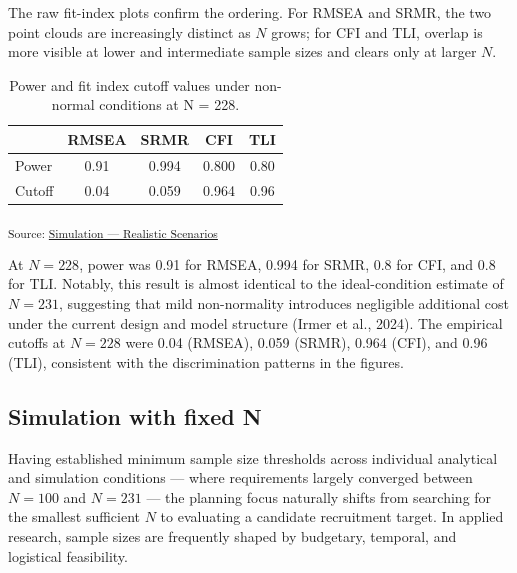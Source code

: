 \documentclass[
  letterpaper,
  DIV=11,
  numbers=noendperiod]{scrartcl}
\begin{document}
The raw fit-index plots confirm the ordering. For RMSEA and SRMR, the
two point clouds are increasingly distinct as \(N\) grows; for CFI and
TLI, overlap is more visible at lower and intermediate sample sizes and
clears only at larger \(N\).

{

\begin{longtable}[]{@{}lcccc@{}}

\caption{\label{tbl-power-cutoff-nnorm}Power and fit index cutoff values
under non-normal conditions at N = 228.}

\tabularnewline

\toprule\noalign{}
& RMSEA & SRMR & CFI & TLI \\
\midrule\noalign{}
\endhead
\bottomrule\noalign{}
\endlastfoot
Power & 0.91 & 0.994 & 0.800 & 0.80 \\
Cutoff & 0.04 & 0.059 & 0.964 & 0.96 \\

\end{longtable}

}

\textsubscript{Source:
\href{https://phdpablo.github.io/cfa-power/Scripts/AnalysisScripts/04_simulation_robust-preview.html\#cell-tbl-power-cutoff-nnorm}{Simulation
--- Realistic Scenarios}}

At \(N = 228\), power was 0.91 for RMSEA, 0.994 for SRMR, 0.8 for CFI,
and 0.8 for TLI. Notably, this result is almost identical to the
ideal-condition estimate of \(N = 231\), suggesting that mild
non-normality introduces negligible additional cost under the current
design and model structure (Irmer et al., 2024). The empirical cutoffs
at \(N = 228\) were 0.04 (RMSEA), 0.059 (SRMR), 0.964 (CFI), and 0.96
(TLI), consistent with the discrimination patterns in the figures.

\subsection{Simulation with fixed N}\label{sec-scenarios-fixed}

Having established minimum sample size thresholds across individual
analytical and simulation conditions --- where requirements largely
converged between \(N = 100\) and \(N = 231\) --- the planning focus
naturally shifts from searching for the smallest sufficient \(N\) to
evaluating a candidate recruitment target. In applied research, sample
sizes are frequently shaped by budgetary, temporal, and logistical
feasibility.
\end{document}
